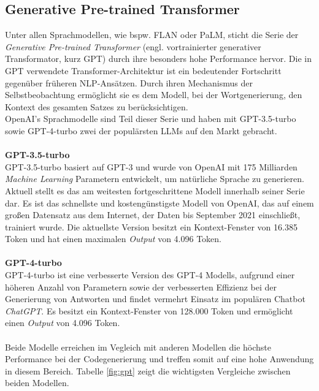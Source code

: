 \subsection{Generative Pre-trained Transformer}
Unter allen Sprachmodellen, wie bspw. FLAN oder PaLM, sticht die Serie der \textit{Generative Pre-trained Transformer} (engl. vortrainierter generativer Transformator, kurz GPT) durch ihre besonders hohe Performance hervor. \cite*{yeComprehensiveCapabilityAnalysis2023} Die in GPT verwendete Transformer-Architektur ist ein bedeutender Fortschritt gegenüber früheren \acs{NLP}-Ansätzen. Durch ihren Mechanismus der Selbstbeobachtung ermöglicht sie es dem Modell, bei der Wortgenerierung, den Kontext des gesamten Satzes zu berücksichtigen. \cite*{yenduriGenerativePretrainedTransformer2023} \\ OpenAI's Sprachmodelle sind Teil dieser Serie und haben mit GPT-3.5-turbo sowie GPT-4-turbo zwei der populärsten LLMs auf den Markt gebracht. \cite*{yaoSurveyLargeLanguage2024}\\\\
\textbf{GPT-3.5-turbo}\\[0.2cm]
GPT-3.5-turbo basiert auf GPT-3 und wurde von OpenAI mit 175 Milliarden \textit{Machine Learning} Parametern entwickelt, um natürliche Sprache zu generieren. Aktuell stellt es das am weitesten fortgeschrittene Modell innerhalb seiner Serie dar. \cite*{yeComprehensiveCapabilityAnalysis2023} Es ist das schnellste und kostengünstigste Modell von OpenAI, das auf einem großen Datensatz aus dem Internet, der Daten bis September 2021 einschließt, trainiert wurde. Die aktuellste Version besitzt ein Kontext-Fenster von 16.385 Token und hat einen maximalen \textit{Output} von 4.096 Token. \cite*{OpenAIPlatform}\\\\
\textbf{GPT-4-turbo}\\[0.2cm]
GPT-4-turbo ist eine verbesserte Version des GPT-4 Modells, aufgrund einer höheren Anzahl von Parametern sowie der verbesserten Effizienz bei der Generierung von Antworten und findet vermehrt Einsatz im populären Chatbot \textit{ChatGPT}. \cite*{shahandashtiEvaluatingEffectivenessGPT42024} Es besitzt ein Kontext-Fenster von 128.000 Token und ermöglicht einen \textit{Output} von 4.096 Token. \cite*{OpenAIPlatform}\\\\
Beide Modelle erreichen im Vegleich mit anderen Modellen die höchste Performance bei der Codegenerierung und treffen somit auf eine hohe Anwendung in diesem Bereich. \cite*{duEvaluatingLargeLanguage2024} Tabelle \ref{fig:gpt} zeigt die wichtigsten Vergleiche zwischen beiden Modellen.



